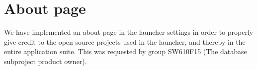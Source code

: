 
\section{About page}
\label{sec:about_page}

We have implemented an about page in the launcher settings in order to properly give credit to the open source projects used in the launcher, and thereby in the entire \giraf application suite. This was requested by group SW610F15 (The database subproject product owner). 

